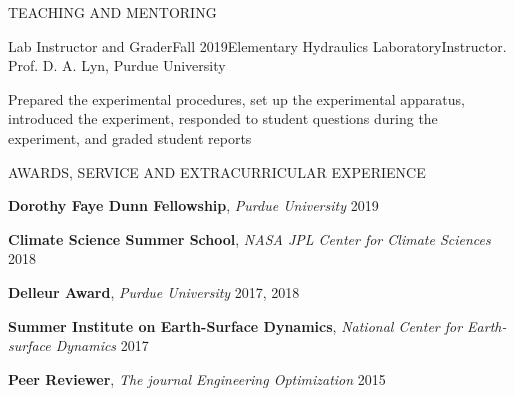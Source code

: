 \documentclass{resume_anzy.cls} %
\begin{document}

\begin{rSection}{TEACHING AND MENTORING}
\begin{rSubsection}{Lab Instructor and Grader}{Fall 2019}{Elementary Hydraulics Laboratory}{Instructor. Prof. D. A. Lyn, Purdue University}
\item  Prepared the experimental procedures, set up the experimental apparatus, introduced the experiment, responded to student questions during the experiment, and graded student reports 
\end{rSubsection}
\end{rSection}

\begin{rSection}{AWARDS, SERVICE AND EXTRACURRICULAR  EXPERIENCE}
\vspace{-2.5mm}
\item \textbf{Dorothy Faye Dunn Fellowship}, \textit{Purdue University} \hfill{2019}
\item \textbf{Climate Science Summer School}, \textit{NASA JPL Center for Climate Sciences} \hfill{2018}
\item \textbf{Delleur Award}, \textit{Purdue University} \hfill{2017, 2018}
\item \textbf{Summer Institute on Earth-Surface Dynamics}, \textit{National Center for Earth-surface Dynamics} \hfill{2017}
\item \textbf{Peer Reviewer}, \textit{The journal Engineering Optimization} \hfill{2015}
\end{rSection}



\end{document}
